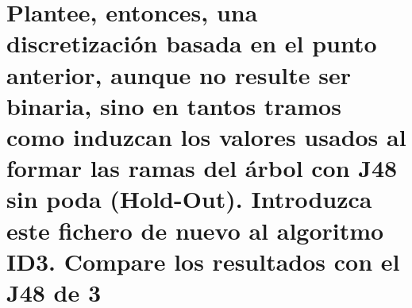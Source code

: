 \documentclass[10pt, a4paper,spanish]{article}
\begin{document}
		\paragraph{}


	\section{Plantee, entonces, una discretización basada en el punto anterior, aunque no resulte ser binaria, sino en tantos tramos como induzcan los valores usados al formar las ramas del árbol con J48 sin poda (Hold-Out). Introduzca este fichero de nuevo al algoritmo ID3. Compare los resultados con el J48 de 3}

		\paragraph{}



	\nocite{subject:taa}
	\nocite{github:ismtabo-treetograph}
  
  
\end{document}
